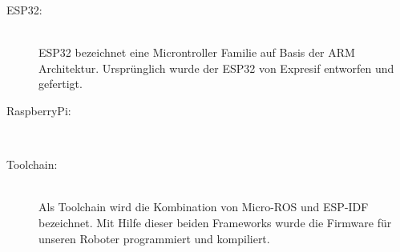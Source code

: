 \begin{flushleft}
\begin{description}
        \item[ESP32:]\hfill\\
        ESP32 bezeichnet eine Microntroller Familie auf Basis der ARM Architektur.
        Ursprünglich wurde der ESP32 von Expresif entworfen und gefertigt.

        \item[RaspberryPi:]\hfill\\
        
        \item[Toolchain:] \hfill\\
        Als Toolchain wird die Kombination von Micro-ROS und ESP-IDF bezeichnet.
        Mit Hilfe dieser beiden Frameworks wurde die Firmware für unseren Roboter programmiert und kompiliert.
        \end{description}
\end{flushleft}
